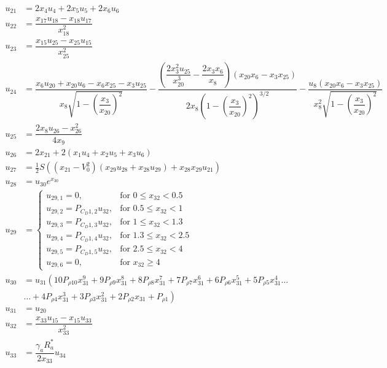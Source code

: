 \begin{equation} \label{eq:unAuxEq2}
\begin{split}
u_{21} &= 2x_{4}u_{4}+2x_{5}u_{5}+2x_{6}u_{6}\\
u_{22} &= \dfrac{x_{17}u_{18}-x_{18}u_{17}}{x_{18}^{2}}\\
u_{23} &= \dfrac{x_{15}u_{25}-x_{25}u_{15}}{x_{25}^{2}}\\
u_{24} &=  \dfrac{x_{6}u_{20}+x_{20}u_{6}-x_{6}x_{25}-x_{3}u_{25}}{x_{8}\sqrt{1-\left(\dfrac{x_{3}}{x_{20}}\right)^{2}}}-\dfrac{\left(\dfrac{2x_{3}^{2}u_{25}}{x_{20}^{3}}-\dfrac{2x_{3}x_{6}}{x_{8}}\right)\left(x_{20}x_{6}-x_{3}x_{25}\right)}{2x_{8}\left(1-\left(\dfrac{x_{3}}{x_{20}}\right)^{2}\right)^{3/2}}-\dfrac{u_{8}\left(x_{20}x_{6}-x_{3}x_{25}\right)}{x_{8}^{2}\sqrt{1-\left(\dfrac{x_{3}}{x_{20}}\right)^{2}}}\\
u_{25} &=  \dfrac{2x_{8}u_{26}-x_{26}^{2}}{4x_{9}}\\
u_{26} &=  2x_{21}+2\left(x_{1}u_{4}+x_{2}u_{5}+x_{3}u_{6}\right)\\
u_{27} &= \frac{1}{2}S\left(\left(x_{21}-V_{0}^{2}\right)\left(x_{29}u_{28}+x_{28}u_{29}\right)+x_{28}x_{29}u_{21}\right) \\
u_{28} &= u_{30}e^{x_{30}} \\
u_{29} &=\begin{cases}
u_{29,1}=0, & \text{for } 0\leq x_{32} < 0.5\\
u_{29,2}=P_{C_{D} 1,2}u_{32}, &  \text{for } 0.5\leq x_{32} < 1 \\
u_{29,3}=P_{C_{D} 1,3}u_{32}, &  \text{for } 1\leq x_{32} < 1.3 \\
u_{29,4}=P_{C_{D} 1,4}u_{32}, &  \text{for } 1.3\leq x_{32} < 2.5 \\
u_{29,5}=P_{C_{D} 1,5}u_{32}, &  \text{for } 2.5\leq x_{32} < 4 \\
u_{29,6}=0, &  \text{for } x_{32} \geq 4 
\end{cases}\\
u_{30} &=u_{31} \left(10 P_{\rho 10}x_{31}^{9}+9 P_{\rho 9}x_{31}^{8}+8 P_{\rho 8}x_{31}^{7}+7 P_{\rho 7}x_{31}^{6}+6 P_{\rho 6}x_{31}^{5}+5 P_{\rho 5}x_{31}^{4}\dots \right. \\
& \left. \dotsc +4 P_{\rho 4}x_{31}^{3}+3 P_{\rho 3}x_{31}^{2}+2 P_{\rho 2}x_{31}+P_{\rho 1}\right) \\
u_{31} &= u_{20}\\
u_{32} &= \dfrac{x_{33}u_{15}-x_{15}u_{33}}{x_{33}^{2}}\\
u_{33} &= \dfrac{\gamma_{a}R_{a}^{*}}{2x_{33}}u_{34} \\

\end{split}
\end{equation}
